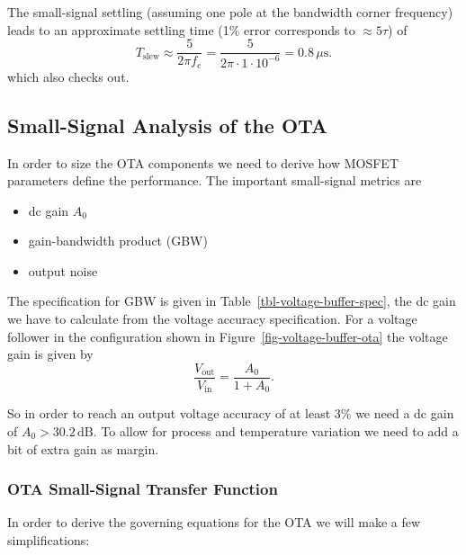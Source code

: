 \documentclass[
  a4paper,
  DIV=11,
  numbers=noendperiod]{scrartcl}
\providecommand{\tightlist}{%
  \setlength{\itemsep}{0pt}\setlength{\parskip}{0pt}}\usepackage{longtable,booktabs,array}
\begin{document}
The small-signal settling (assuming one pole at the bandwidth corner
frequency) leads to an approximate settling time (1\% error corresponds
to \(\approx 5 \tau\)) of \[
T_\mathrm{slew} \approx \frac{5}{2 \pi f_\mathrm{c}} = \frac{5}{2 \pi \cdot 1 \cdot 10^{-6}} = 0.8\,\mu\text{s}.
\] which also checks out.

\subsection{Small-Signal Analysis of the
OTA}\label{sec-basic-ota-small-signal}

In order to size the OTA components we need to derive how MOSFET
parameters define the performance. The important small-signal metrics
are

\begin{itemize}
\tightlist
\item
  dc gain \(A_0\)
\item
  gain-bandwidth product (GBW)
\item
  output noise
\end{itemize}

The specification for GBW is given in
Table~\ref{tbl-voltage-buffer-spec}, the dc gain we have to calculate
from the voltage accuracy specification. For a voltage follower in the
configuration shown in Figure~\ref{fig-voltage-buffer-ota} the voltage
gain is given by \[
\frac{V_\mathrm{out}}{V_\mathrm{in}} = \frac{A_0}{1 + A_0}.
\]

So in order to reach an output voltage accuracy of at least 3\% we need
a dc gain of \(A_0 > 30.2\,\text{dB}\). To allow for process and
temperature variation we need to add a bit of extra gain as margin.

\subsubsection{OTA Small-Signal Transfer
Function}\label{ota-small-signal-transfer-function}

In order to derive the governing equations for the OTA we will make a
few simplifications:
\end{document}
